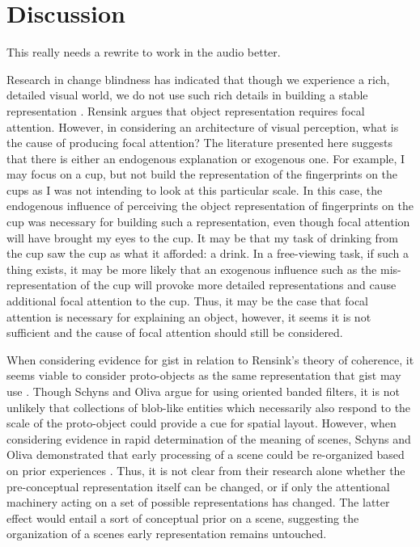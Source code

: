 

\section{Discussion}

This really needs a rewrite to work in the audio better.

Research in change blindness has indicated that though we experience a rich, detailed visual world, we do not use such rich details in building a stable representation \cite{Simons1997}.  Rensink argues that object representation requires focal attention.  However, in considering an architecture of visual perception, what is the cause of producing focal attention?  The literature presented here suggests that there is either an endogenous explanation or exogenous one.  For example, I may focus on a cup, but not build the representation of the fingerprints on the cups as I was not intending to look at this particular scale.  In this case, the endogenous influence of perceiving the object representation of fingerprints on the cup was necessary for building such a representation, even though focal attention will have brought my eyes to the cup.  It may be that my task of drinking from the cup saw the cup as what it afforded: a drink.  In a free-viewing task, if such a thing exists, it may be more likely that an exogenous influence such as the mis-representation of the cup will provoke more detailed representations and cause additional focal attention to the cup.  Thus, it may be the case that focal attention is necessary for explaining an object, however, it seems it is not sufficient and the cause of focal attention should still be considered.  

When considering evidence for gist in relation to Rensink's theory of coherence, it seems viable to consider proto-objects as the same representation that gist may use \cite{Rensink2002}.  Though Schyns and Oliva argue for using oriented banded filters, it is not unlikely that collections of blob-like entities which necessarily also respond to the scale of the proto-object could provide a cue for spatial layout.   However, when considering evidence in rapid determination of the meaning of scenes, Schyns and Oliva demonstrated that early processing of a scene could be re-organized based on prior experiences \cite{Schyns1994,Oliva1997}.  Thus, it is not clear from their research alone whether the pre-conceptual representation itself can be changed, or if only the attentional machinery acting on a set of possible representations has changed.  The latter effect would entail a sort of conceptual prior on a scene, suggesting the organization of a scenes early representation remains untouched.

